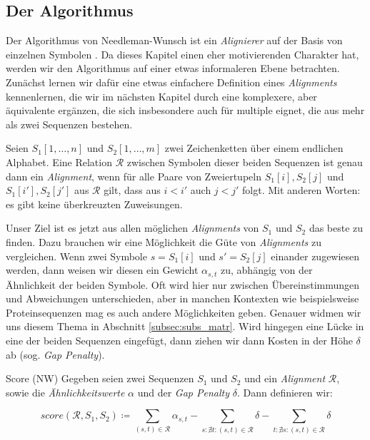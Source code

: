 \subsection{Der Algorithmus}

Der Algorithmus von Needleman-Wunsch ist ein \emph{Alignierer} auf der Basis von einzelnen Symbolen \citep{nw70}. Da dieses Kapitel einen eher motivierenden Charakter hat, werden wir den Algorithmus auf einer etwas informaleren Ebene betrachten. Zunächst lernen wir dafür eine etwas einfachere Definition eines \emph{Alignments} kennenlernen, die wir im nächsten Kapitel durch eine komplexere, aber äquivalente ergänzen, die sich insbesondere auch für multiple eignet, die aus mehr als zwei Sequenzen bestehen.

\begin{definition}[Alignment (NW)]
	Seien $S_1[1,\dots, n]$ und $S_2[1,\dots,m]$ zwei Zeichenketten über einem endlichen Alphabet. Eine Relation $\mathcal{R}$ zwischen Symbolen dieser beiden Sequenzen ist genau dann ein \emph{Alignment}, wenn für alle Paare von Zweiertupeln $S_1[i],S_2[j]$ und $S_1[i'],S_2[j']$ aus $\mathcal{R}$ gilt, dass aus $i < i'$ auch $j < j'$ folgt. Mit anderen Worten: es gibt keine überkreuzten Zuweisungen.
\end{definition}

Unser Ziel ist es jetzt aus allen möglichen \emph{Alignments} von $S_1$ und $S_2$ das beste zu finden. Dazu brauchen wir eine Möglichkeit die Güte von \emph{Alignments} zu vergleichen. Wenn zwei Symbole $s = S_1[i]$ und $s' = S_2[j]$ einander zugewiesen werden, dann weisen wir diesen ein Gewicht $\alpha_{s,t}$ zu, abhängig von der Ähnlichkeit der beiden Symbole. Oft wird hier nur zwischen Übereinstimmungen und Abweichungen unterschieden, aber in manchen Kontexten wie beispielsweise Proteinsequenzen mag es auch andere Möglichkeiten geben. Genauer widmen wir uns diesem Thema in Abschnitt \ref{subsec:subs_matr}. Wird hingegen eine Lücke in eine der beiden Sequenzen eingefügt, dann ziehen wir dann Kosten in der Höhe $\delta$ ab (sog. \emph{Gap Penalty}).

\begin{definition}{Score (NW)}
	Gegeben seien zwei Sequenzen $S_1$ und $S_2$ und ein \emph{Alignment} $\mathcal{R}$, sowie die \emph{Ähnlichkeitswerte} $\alpha$ und  der \emph{Gap Penalty} $\delta$. Dann definieren wir:
	
	\begin{equation}
		score(\mathcal{R},S_1,S_2) \coloneqq \sum_{(s,t)\in \mathcal{R}}{\alpha_{s,t}} - \sum_{s : \nexists t : (s,t)\in \mathcal{R}}{\delta} - \sum_{t : \nexists s : (s,t)\in \mathcal{R}}{\delta}
	\end{equation}
\end{definition}

